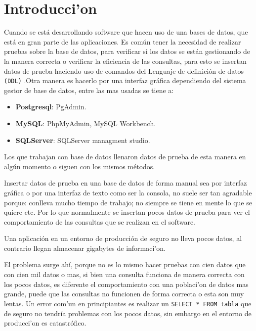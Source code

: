 
\chapter{Introducci'on}
\renewcommand{\footrulewidth}{0.4pt}%
\pagestyle{plain}

Cuando se est\'a desarrollando software que hacen  uso de una bases de datos, que est\'a en gran parte de las aplicaciones. Es com\'un tener la necesidad de realizar pruebas sobre la base de datos, para verificar si los datos se est\'an gestionando de la manera correcta o verificar la eficiencia  de las consultas, para esto se insertan datos de prueba haciendo uso de comandos del Lenguaje de definici\'on de datos \texttt{(DDL)} \cite{ddl}.Otra manera es hacerlo por una interfaz gr\'afica dependiendo del sistema gestor de base de datos, entre las mas usadas se tiene a:
\begin{itemize}
\item \textbf{Postgresql}: PgAdmin.
\item \textbf{MySQL}: PhpMyAdmin, MySQL Workbench.
\item \textbf{SQLServer}: SQLServer managment studio.
\end{itemize}
Los que trabajan con base de datos llenaron datos de prueba de esta manera en alg\'un momento o siguen con los mismos m\'etodos.

Insertar datos de prueba en una base de datos de forma manual sea por interfaz gr\'afica o por una interfaz de texto como ser la consola, no suele ser tan agradable porque: conlleva mucho tiempo de trabajo; no siempre se tiene en mente lo que se quiere etc. Por lo que normalmente se insertan pocos datos de prueba para ver el comportamiento de las consultas que se realizan en el software. 

Una aplicaci\'on en un entorno de producci\'on de seguro no lleva pocos datos, al contrario llegan almacenar gigabytes de informaci'on.

El problema surge ah\'i, porque no es lo mismo hacer pruebas con cien datos que con cien mil datos o mas, si bien una consulta funciona de manera correcta con los pocos datos, es diferente el comportamiento con una poblaci'on de datos mas grande, puede que las consultas no funcionen de forma correcta o esta son muy lentas. Un error com'un en principiantes es realizar un \texttt{SELECT * FROM tabla} que de seguro no tendr\'ia problemas con los pocos datos, sin embargo en el entorno de producci'on es catastr\'ofico. 

